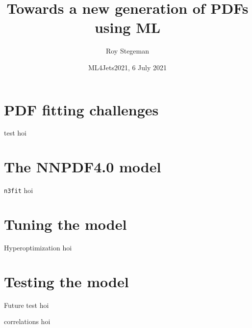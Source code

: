 \documentclass[aspectratio=169]{beamer}
\title{Towards a new generation of PDFs using ML}
\date{ML4Jets2021, 6 July 2021}
\author{Roy Stegeman}
\institute{University of Milan and INFN Milan}
\begin{document}
{
\begin{frame}
  \titlepage
\end{frame}
}


\section{PDF fitting challenges}


\begin{frame}{test}
  hoi
\end{frame}


\section{The NNPDF4.0 model}

\begin{frame}{\texttt{n3fit}}
  hoi
\end{frame}


\section{Tuning the model}

\begin{frame}{Hyperoptimization}
  hoi
\end{frame}


\section{Testing the model}


\begin{frame}{Future test}
  hoi
\end{frame}

\begin{frame}{correlations}
  hoi
\end{frame}
\end{document}
